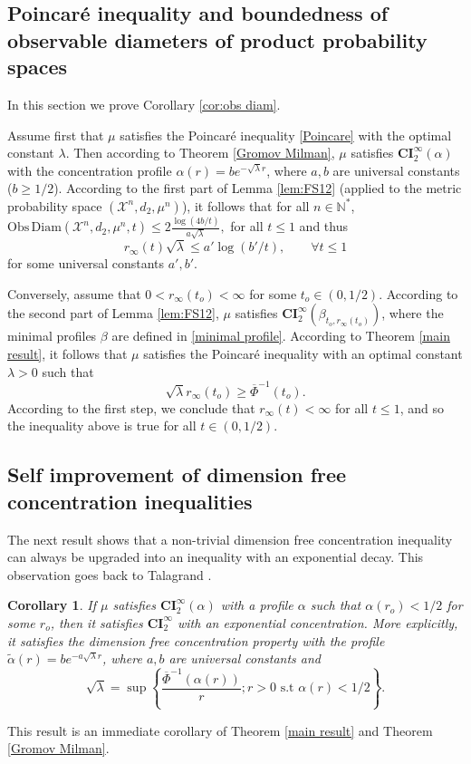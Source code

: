 \documentclass[11pt]{amsart}
\newtheorem{cor}[equation]{Corollary}
\numberwithin{equation}{section}
\begin{document}
\subsection{Poincar\'e inequality and boundedness of observable diameters of product probability spaces}
In this section we prove Corollary \ref{cor:obs diam}.

Assume first that $\mu$ satisfies the Poincar\'e inequality \eqref{Poincare} with the optimal constant $\lambda$. Then according to Theorem \ref{Gromov Milman}, $\mu$ satisfies $\mathbf{CI}_2^\infty(\alpha)$ with the concentration profile $\alpha(r)=be^{-\sqrt{\lambda}r}$, where $a,b$ are universal constants ($b\geq 1/2$). According to the first part of Lemma \ref{lem:FS12} (applied to the metric probability space $({\mathcal{X}}^n,d_2,\mu^n)$), it follows that for all $n\in {\mathbb{N}}^*$, $\mathrm{Obs\, Diam}({\mathcal{X}}^n,d_2,\mu^n, t) \leq 2\frac{\log(4b/t)}{a\sqrt{\lambda}},$ for all $t\leq 1$
and thus 
\[
r_\infty(t)\sqrt{\lambda}\leq a'\log(b'/t),\qquad \forall t\leq 1
\] 
for some universal constants $a',b'.$ 

Conversely, assume that $0<r_\infty(t_o)<\infty$ for some $t_o\in (0,1/2).$ According to the second part of Lemma \ref{lem:FS12}, $\mu$ satisfies $\mathbf{CI}_2^\infty(\beta_{t_o,r_\infty(t_o)})$, where the minimal profiles $\beta$ are defined in \eqref{minimal profile}. According to Theorem \ref{main result}, it
follows that $\mu$ satisfies the Poincar\'e inequality with an optimal constant $\lambda>0$ such that
\[
\sqrt{\lambda}r_\infty(t_o) \geq \overline{\Phi}^{-1}(t_o).
\]
According to the first step, we conclude that $r_\infty(t)<\infty$ for all $t\leq 1$, and so the inequality above is true for all $t\in (0,1/2).$
\endproof

\subsection{Self improvement of dimension free concentration inequalities}\label{self improvement}
The next result shows that a non-trivial dimension free concentration inequality can always be upgraded into an inequality with an exponential decay. This observation goes back to Talagrand \cite[Proposition 5.1]{Tal91}. 
\begin{cor}\label{Cor Tal}
If $\mu$ satisfies $\mathbf{CI}_2^\infty(\alpha)$ with a profile $\alpha$ such that $\alpha(r_o)<1/2$ for some $r_o$, then it satisfies $\mathbf{CI}_2^\infty$ with an exponential concentration. More explicitly, it satisfies the dimension free concentration property with the profile $\tilde{\alpha}(r)=be^{-a\sqrt{\lambda}r}$, where $a,b$ are universal constants and 
\[
\sqrt{\lambda}= \sup \left\{\frac{\overline{\Phi}^{-1} \left(\alpha(r)\right)}{r}; r>0 \text{ s.t } \alpha (r) < 1/2  \right\}.
\]
\end{cor}
This result is an immediate corollary of Theorem \ref{main result} and Theorem \ref{Gromov Milman}.
\end{document}

